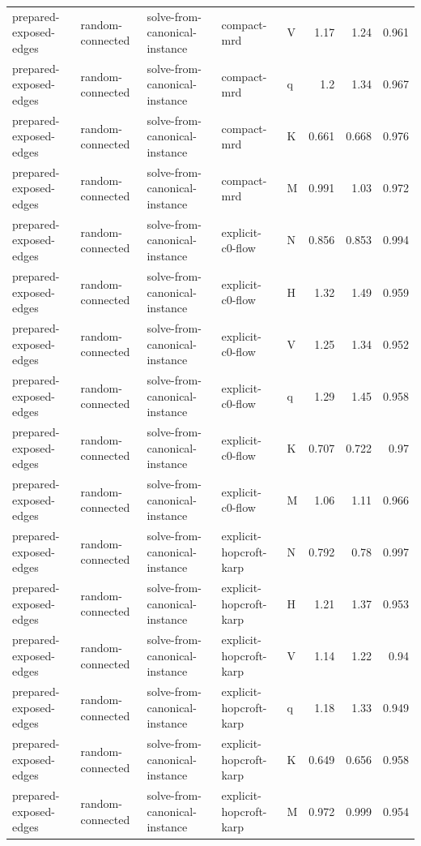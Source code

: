 \begin{table}[t]
\begin{tabular}{lllllrrr}
prepared-exposed-edges & random-connected & solve-from-canonical-instance & compact-mrd & V & 1.17 & 1.24 & 0.961 \\
prepared-exposed-edges & random-connected & solve-from-canonical-instance & compact-mrd & q & 1.2 & 1.34 & 0.967 \\
prepared-exposed-edges & random-connected & solve-from-canonical-instance & compact-mrd & K & 0.661 & 0.668 & 0.976 \\
prepared-exposed-edges & random-connected & solve-from-canonical-instance & compact-mrd & M & 0.991 & 1.03 & 0.972 \\
prepared-exposed-edges & random-connected & solve-from-canonical-instance & explicit-c0-flow & N & 0.856 & 0.853 & 0.994 \\
prepared-exposed-edges & random-connected & solve-from-canonical-instance & explicit-c0-flow & H & 1.32 & 1.49 & 0.959 \\
prepared-exposed-edges & random-connected & solve-from-canonical-instance & explicit-c0-flow & V & 1.25 & 1.34 & 0.952 \\
prepared-exposed-edges & random-connected & solve-from-canonical-instance & explicit-c0-flow & q & 1.29 & 1.45 & 0.958 \\
prepared-exposed-edges & random-connected & solve-from-canonical-instance & explicit-c0-flow & K & 0.707 & 0.722 & 0.97 \\
prepared-exposed-edges & random-connected & solve-from-canonical-instance & explicit-c0-flow & M & 1.06 & 1.11 & 0.966 \\
prepared-exposed-edges & random-connected & solve-from-canonical-instance & explicit-hopcroft-karp & N & 0.792 & 0.78 & 0.997 \\
prepared-exposed-edges & random-connected & solve-from-canonical-instance & explicit-hopcroft-karp & H & 1.21 & 1.37 & 0.953 \\
prepared-exposed-edges & random-connected & solve-from-canonical-instance & explicit-hopcroft-karp & V & 1.14 & 1.22 & 0.94 \\
prepared-exposed-edges & random-connected & solve-from-canonical-instance & explicit-hopcroft-karp & q & 1.18 & 1.33 & 0.949 \\
prepared-exposed-edges & random-connected & solve-from-canonical-instance & explicit-hopcroft-karp & K & 0.649 & 0.656 & 0.958 \\
prepared-exposed-edges & random-connected & solve-from-canonical-instance & explicit-hopcroft-karp & M & 0.972 & 0.999 & 0.954 \\

\end{tabular}
\end{table}
